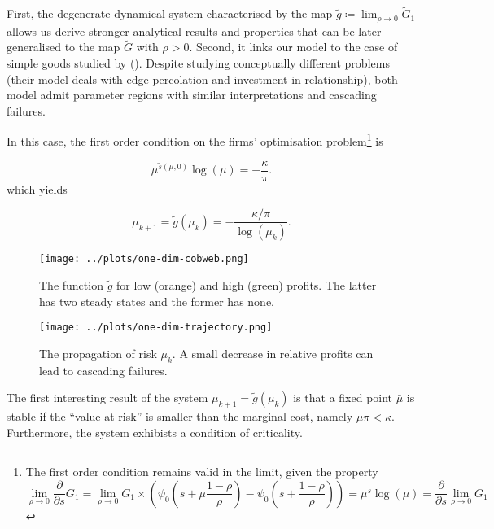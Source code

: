\documentclass[american, abstract=on]{scrartcl}
\theoremstyle{plain}
\newcommand{\citein}[1]{\citeauthor{#1} (\citeyear{#1})}
\begin{document}
First, the degenerate dynamical system characterised by the map $\tilde{g} \coloneqq \lim_{\rho \to 0} \tilde{G}_1$ allows us derive stronger analytical results and properties that can be later generalised to the map $\tilde{G}$ with $\rho > 0$. Second, it links our model to the case of simple goods studied by \citein{elliott_supply_2022}. Despite studying conceptually different problems (their model deals with edge percolation and investment in relationship), both model admit parameter regions with similar interpretations and cascading failures.

In this case, the first order condition on the firms' optimisation problem\footnote{
  The first order condition remains valid in the limit, given the property
  \begin{equation}
    \lim_{\rho \rightarrow 0} \frac{\partial}{\partial s}G_1 = \lim_{\rho \rightarrow 0} G_1 \times \left(\psi_0\left(s + \mu \frac{1 - \rho}{\rho} \right) - \psi_0\left(s + \frac{1 - \rho}{\rho} \right) \right) = \mu^{s} \log(\mu) = \frac{\partial}{\partial s} \lim_{\rho \rightarrow 0} G_1
  \end{equation}
} is

\begin{equation}
  \mu^{\tilde{s}(\mu, 0)} \log(\mu) = -\frac{\kappa}{\pi}.
\end{equation} which yields

\begin{equation}
  \mu_{k+1} = \tilde{g}(\mu_k) = -\frac{\kappa / \pi}{\log(\mu_k)}.
\end{equation}

\begin{figure}[H]
  \centering
  \texttt{[image: ../plots/one-dim-cobweb.png]}
  \caption{The function $\tilde{g}$ for low (orange) and high (green) profits. The latter has two steady states and the former has none.}
  \label{fig:one-dimensional:cobweb}
\end{figure}




\begin{figure}[H]
  \centering
  \texttt{[image: ../plots/one-dim-trajectory.png]}
  \caption{The propagation of risk $\mu_k$. A small decrease in relative profits can lead to cascading failures. }
  \label{fig:one-dimensional:trajectory}
\end{figure}



The first interesting result of the system $\mu_{k + 1} = \tilde{g}(\mu_k)$ is that a fixed point $\bar{\mu}$ is stable if the ``value at risk'' is smaller than the marginal cost, namely $\mu \pi < \kappa$. Furthermore, the system exhibists a condition of criticality. 
\end{document}
